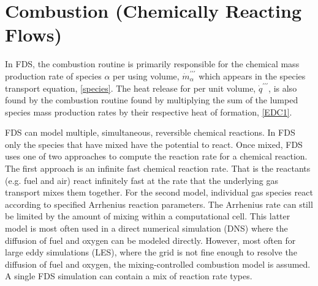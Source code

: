 \chapter{Combustion (Chemically Reacting Flows)}

\label{combustionsection}
In FDS, the combustion routine is primarily responsible for the chemical mass production rate of species $\alpha$ per using volume, $\dot{m}^{\prime\prime\prime}_{\alpha}$ which appears in the species transport equation, \ref{species}. The heat release for per unit volume, $\dot{q}^{\prime\prime\prime}$, is also found by the combustion routine found by multiplying the sum of the lumped species mass production rates by their respective heat of formation, \ref{EDC1}.

FDS can model multiple, simultaneous, reversible chemical reactions.  In FDS only the species that have mixed have the potential to react. Once mixed, FDS uses one of two approaches to compute the reaction rate for a chemical reaction.  The first approach is an infinite fast chemical reaction rate. That is the reactants (e.g. fuel and air) react infinitely fast at the rate that the underlying gas transport mixes them together.  For the second model, individual gas species react according to specified Arrhenius reaction parameters. The Arrhenius rate can still be limited by the amount of mixing within a computational cell. This latter model is most often used in a direct numerical simulation (DNS) where the diffusion of fuel and oxygen can be modeled directly. However, most often for large eddy simulations (LES), where the grid is not fine enough to resolve the diffusion of fuel and oxygen,
the mixing-controlled combustion model is assumed. A single FDS simulation can contain a mix of reaction rate types.

